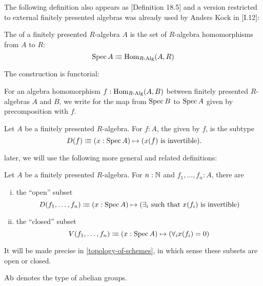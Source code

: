 The following definition also appears as \cite{ingo-thesis}[Definition 18.5]
and a version restricted to external finitely presented algebras was already used by Anders Kock in \cite{kock-sdg}[I.12]:

\begin{definition}
  \label{spec}
  The  of a finitely presented $R$-algebra $A$
  is the set of $R$-algebra homomorphisms from $A$ to $R$:
  \[ \operatorname{Spec} A \vcentcolon\mspace{-1.2mu}\equiv \mathrm{Hom}_{R\text{-}\mathrm{Alg}}(A, R) \]
\end{definition}

The construction is functorial:

\begin{definition}
  \label{spec-on-maps}
  For an algebra homomorphism $f:\mathrm{Hom}_{R\text{-}\mathrm{Alg}}(A,B)$
  between finitely presented $R$-algebras $A$ and $B$,
  we write  for the map from $\operatorname{Spec} B$ to $\operatorname{Spec} A$
  given by precomposition with $f$.
\end{definition}

\begin{definition}%
  \label{standard-open-subset}
  Let $A$ be a finitely presented $R$-algebra.
  For $f:A$, the  given by $f$,
  is the subtype 
  \[
    D(f)\colonequiv (x:\Spec A)\mapsto (x(f)\text{ is invertible})
    \rlap{.}
  \]
\end{definition}

later, we will use the following more general and related definitions:

\begin{definition}
  \label{open-closed-affine-subsets}
  Let $A$ be a finitely presented $R$-algebra.
  For $n:\mathbb{N}$ and $f_1,\dots,f_n:A$, there are
  \begin{enumerate}[(i)]
  \item the ``open'' subset
    \[
      D(f_1,\dots,f_n)\vcentcolon\mspace{-1.2mu}\equiv (x:\operatorname{Spec} A)\mapsto (\text{$\exists_i$ such that $x(f_i)$ is invertible})
    \]  
  \item the ``closed'' subset
    \[
      V(f_1,\dots,f_n)\vcentcolon\mspace{-1.2mu}\equiv (x:\operatorname{Spec} A)\mapsto (\forall_i x(f_i)=0)
    \]  
  \end{enumerate}
  It will be made precise in \cref{topology-of-schemes}, in which sense these subsets are open or closed.
\end{definition}

\begin{definition}
  $\AbGroup$\index{$\AbGroup$} denotes the type of abelian groups.
\end{definition}

